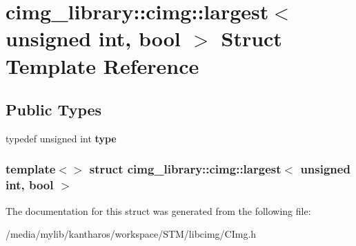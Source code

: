 \hypertarget{structcimg__library_1_1cimg_1_1largest_3_01unsigned_01int_00_01bool_01_4}{
\section{cimg\_\-library::cimg::largest$<$ unsigned int, bool $>$ Struct Template Reference}
\label{structcimg__library_1_1cimg_1_1largest_3_01unsigned_01int_00_01bool_01_4}
}
\subsection*{Public Types}
\begin{DoxyCompactItemize}
\item 
\hypertarget{structcimg__library_1_1cimg_1_1largest_3_01unsigned_01int_00_01bool_01_4_acb1e6fbc8aac96ee462f5d62d5c2c83a}{
typedef unsigned int {\bfseries type}}
\label{structcimg__library_1_1cimg_1_1largest_3_01unsigned_01int_00_01bool_01_4_acb1e6fbc8aac96ee462f5d62d5c2c83a}

\end{DoxyCompactItemize}
\subsubsection*{template$<$$>$ struct cimg\_\-library::cimg::largest$<$ unsigned int, bool $>$}



The documentation for this struct was generated from the following file:\begin{DoxyCompactItemize}
\item 
/media/mylib/kantharos/workspace/STM/libcimg/CImg.h\end{DoxyCompactItemize}
